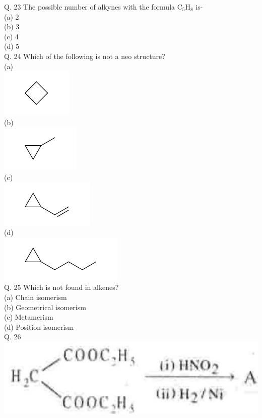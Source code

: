 \documentclass[10pt]{article}
\begin{document}
Q. 23 The possible number of alkynes with the formula $\mathrm{C}_{5} \mathrm{H}_{8}$ is-\\
(a) 2\\
(b) 3\\
(c) 4\\
(d) 5\\
Q. 24 Which of the following is not a neo structure?\\
(a)\\
\includegraphics{smile-8f698d11bbf0f2eae8bc338f73399205569361ef}\\
(b)\\
\includegraphics{smile-41965f68d5d04df607866c159fc6f8c6d36cec4b}\\
(c)\\
\includegraphics{smile-c32eb3a1dcdfa140e08f35313eff45f0e3284821}\\
(d)\\
\includegraphics{smile-651896bf42c62910f0b63a5eed14f65880145fa8}\\
Q. 25 Which is not found in alkenes?\\
(a) Chain isomerism\\
(b) Geometrical isomerism\\
(c) Metamerism\\
(d) Position isomerism\\
Q. 26\\
\includegraphics[max width=\textwidth, center]{2025_01_28_8470952b98110cec3aabg-134}\\
\end{document}
